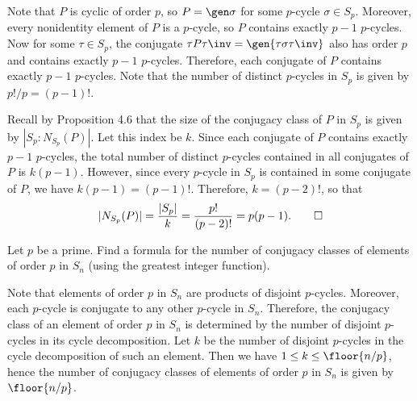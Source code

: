 \begin{sol}
	Note that $P$ is cyclic of order $p$, so $P = \gen\sigma$ for some $p$-cycle $\sigma \in S_p$. Moreover, every nonidentity element of $P$ is a $p$-cycle, so $P$ contains exactly $p - 1$ $p$-cycles. Now for some $\tau \in S_p$, the conjugate $\tau P\tau\inv = \gen{\tau\sigma\tau\inv}$ also has order $p$ and contains exactly $p - 1$ $p$-cycles. Therefore, each conjugate of $P$ contains exactly $p - 1$ $p$-cycles. Note that the number of distinct $p$-cycles in $S_p$ is given by $p!/p = (p - 1)!$.

	Recall by Proposition 4.6 that the size of the conjugacy class of $P$ in $S_p$ is given by $|S_p : N_{S_p}(P)|$. Let this index be $k$. Since each conjugate of $P$ contains exactly $p - 1$ $p$-cycles, the total number of distinct $p$-cycles contained in all conjugates of $P$ is $k(p - 1)$. However, since every $p$-cycle in $S_p$ is contained in some conjugate of $P$, we have $k(p - 1) = (p - 1)!$. Therefore, $k = (p - 2)!$, so that
	\[|N_{S_p}(P)| = \frac{|S_p|}{k} = \frac{p!}{(p - 2)!} = p(p - 1).\qedhere\]
\end{sol}

\begin{exercise}
	Let $p$ be a prime. Find a formula for the number of conjugacy classes of elements of order $p$ in $S_n$ (using the greatest integer function).
\end{exercise}

\begin{sol}
	Note that elements of order $p$ in $S_n$ are products of disjoint $p$-cycles. Moreover, each $p$-cycle is conjugate to any other $p$-cycle in $S_n$. Therefore, the conjugacy class of an element of order $p$ in $S_n$ is determined by the number of disjoint $p$-cycles in its cycle decomposition. Let $k$ be the number of disjoint $p$-cycles in the cycle decomposition of such an element. Then we have $1 \leq k \leq \floor{n/p}$, hence the number of conjugacy classes of elements of order $p$ in $S_n$ is given by $\floor{n/p}$.
\end{sol}

